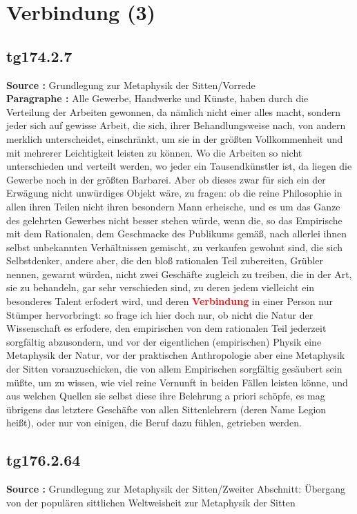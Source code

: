 \documentclass[a4paper,12pt,twoside]{book}
\newcommand{\match}[1]{\textcolor{red}{\textbf{#1}}}
\newcommand{\unnumberedsection}[1]{
	\section*{#1}
	\addcontentsline{toc}{section}{#1}
	\markright{#1}
}
\begin{document}
	\unnumberedsection{Verbindung (3)} 
	\subsection*{tg174.2.7} 
	\textbf{Source : }Grundlegung zur Metaphysik der Sitten/Vorrede\\  
	
	\textbf{Paragraphe : }Alle Gewerbe, Handwerke und Künste, haben durch die Verteilung der Arbeiten gewonnen, da nämlich nicht einer alles macht, sondern jeder sich auf gewisse Arbeit, die sich, ihrer Behandlungsweise nach, von andern merklich unterscheidet, einschränkt, um sie in der größten Vollkommenheit und mit mehrerer Leichtigkeit leisten zu können. Wo die Arbeiten so nicht unterschieden und verteilt werden, wo jeder ein Tausendkünstler ist, da liegen die Gewerbe noch in der größten Barbarei. Aber ob dieses zwar für sich ein der Erwägung nicht unwürdiges Objekt wäre, zu fragen: ob die reine Philosophie in allen ihren Teilen nicht ihren besondern Mann erheische, und es um das Ganze des gelehrten Gewerbes nicht besser stehen würde, wenn die, so das Empirische mit dem Rationalen, dem Geschmacke des Publikums gemäß, nach allerlei ihnen selbst unbekannten Verhältnissen gemischt, zu verkaufen gewohnt sind, die sich Selbstdenker, andere aber, die den bloß rationalen Teil zubereiten, Grübler nennen, gewarnt würden, nicht zwei Geschäfte zugleich zu treiben, die in der Art, sie zu behandeln, gar sehr verschieden sind, zu deren jedem vielleicht ein besonderes Talent erfodert wird, und deren \match{Verbindung} in einer Person nur Stümper hervorbringt: so frage ich hier doch nur, ob nicht die Natur der Wissenschaft es erfodere, den empirischen von dem rationalen Teil jederzeit sorgfältig abzusondern, und vor der eigentlichen (empirischen) Physik eine Metaphysik der Natur, vor der praktischen Anthropologie aber eine Metaphysik der Sitten voranzuschicken, die von allem Empirischen sorgfältig gesäubert sein müßte, um zu  wissen, wie viel reine Vernunft in beiden Fällen leisten könne, und aus welchen Quellen sie selbst diese ihre Belehrung a priori schöpfe, es mag übrigens das letztere Geschäfte von allen Sittenlehrern (deren Name Legion heißt), oder nur von einigen, die Beruf dazu fühlen, getrieben werden. 
	
	\subsection*{tg176.2.64} 
	\textbf{Source : }Grundlegung zur Metaphysik der Sitten/Zweiter Abschnitt: Übergang von der populären sittlichen Weltweisheit zur Metaphysik der Sitten\\  
	
\end{document}
